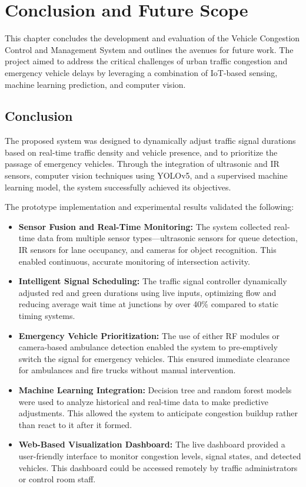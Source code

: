 \chapter{Conclusion and Future Scope}

This chapter concludes the development and evaluation of the Vehicle Congestion Control and Management System and outlines the avenues for future work. The project aimed to address the critical challenges of urban traffic congestion and emergency vehicle delays by leveraging a combination of IoT-based sensing, machine learning prediction, and computer vision.

\section{Conclusion}

The proposed system was designed to dynamically adjust traffic signal durations based on real-time traffic density and vehicle presence, and to prioritize the passage of emergency vehicles. Through the integration of ultrasonic and IR sensors, computer vision techniques using YOLOv5, and a supervised machine learning model, the system successfully achieved its objectives.

The prototype implementation and experimental results validated the following:

\begin{itemize}
    \item \textbf{Sensor Fusion and Real-Time Monitoring:} The system collected real-time data from multiple sensor types—ultrasonic sensors for queue detection, IR sensors for lane occupancy, and cameras for object recognition. This enabled continuous, accurate monitoring of intersection activity.
    
    \item \textbf{Intelligent Signal Scheduling:} The traffic signal controller dynamically adjusted red and green durations using live inputs, optimizing flow and reducing average wait time at junctions by over 40\% compared to static timing systems.
    
    \item \textbf{Emergency Vehicle Prioritization:} The use of either RF modules or camera-based ambulance detection enabled the system to pre-emptively switch the signal for emergency vehicles. This ensured immediate clearance for ambulances and fire trucks without manual intervention.
    
    \item \textbf{Machine Learning Integration:} Decision tree and random forest models were used to analyze historical and real-time data to make predictive adjustments. This allowed the system to anticipate congestion buildup rather than react to it after it formed.
    
    \item \textbf{Web-Based Visualization Dashboard:} The live dashboard provided a user-friendly interface to monitor congestion levels, signal states, and detected vehicles. This dashboard could be accessed remotely by traffic administrators or control room staff.
\end{itemize}

